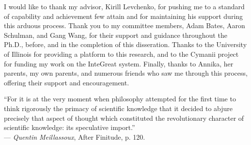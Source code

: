 \documentclass[
    11pt,
    edeposit,
    forcebottom]{uiucthesis2020}
\begin{document}
\begin{frontmatter}
I would like to thank my advisor, Kirill Levchenko, for pushing me to a standard of capability and achievement few attain and for maintaining his support during this arduous process.
Thank you to my committee members, Adam Bates, Aaron Schulman, and Gang Wang, for their support and guidance throughout the Ph.D., before, and in the completion of this disseration.
Thanks to the University of Illinois for providing a platform to this research, and to the Cymanii project for funding my work on the InteGreat system.
Finally, thanks to Annika, her parents, my own parents, and numerous friends who saw me through this process, offering their support and encouragement.

\begin{dedication}``For it is at the very moment when philosophy attempted for the first time to
	think rigorously the primacy of scientific knowledge that it decided to
	abjure precisely that aspect of thought which constituted the
	revolutionary character of scientific knowledge: its speculative
	import.'' \\
	--- \emph{Quentin Meillassoux}, After Finitude, p. 120.
\end{dedication}

\tableofcontents
\listoftables
\listoffigures
{}

\end{frontmatter}


\end{document}
